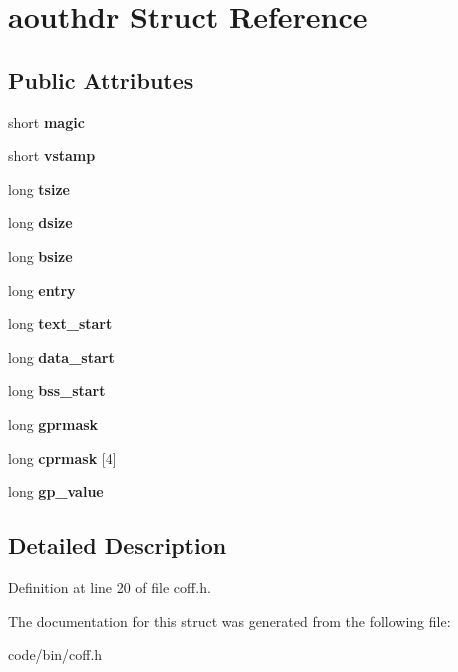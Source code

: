 \section{aouthdr Struct Reference}
\label{structaouthdr}
\subsection*{Public Attributes}
\begin{DoxyCompactItemize}
\item 
short {\bfseries magic}\label{structaouthdr_ace237852270c094dd4185f49963181a9}

\item 
short {\bfseries vstamp}\label{structaouthdr_acdecb20803a0e10aa4fdb6a844267c74}

\item 
long {\bfseries tsize}\label{structaouthdr_a6368090c383d0c441c40b49c316219b0}

\item 
long {\bfseries dsize}\label{structaouthdr_a1eb7a64f2d2d5e341efdf54dd3636a7a}

\item 
long {\bfseries bsize}\label{structaouthdr_a294f1e4edb798c4c67f95cec9f015a66}

\item 
long {\bfseries entry}\label{structaouthdr_aedc4907be0951b0103460335d55075af}

\item 
long {\bfseries text\+\_\+start}\label{structaouthdr_acabcb1b1d04ab0b6f42c1d7319beaea4}

\item 
long {\bfseries data\+\_\+start}\label{structaouthdr_a759d5be21871df26f138c2b93190f297}

\item 
long {\bfseries bss\+\_\+start}\label{structaouthdr_a5f6556d5e3544741b5b3d1abcd0cdf45}

\item 
long {\bfseries gprmask}\label{structaouthdr_ada9d272dee968d6d4b4497d51375b9b6}

\item 
long {\bfseries cprmask} [4]\label{structaouthdr_a5fc6f6354180a92e18781a4524407b01}

\item 
long {\bfseries gp\+\_\+value}\label{structaouthdr_abab379e486fe7d8ff3793fd098aa99be}

\end{DoxyCompactItemize}


\subsection{Detailed Description}


Definition at line 20 of file coff.\+h.



The documentation for this struct was generated from the following file\+:\begin{DoxyCompactItemize}
\item 
code/bin/coff.\+h\end{DoxyCompactItemize}
